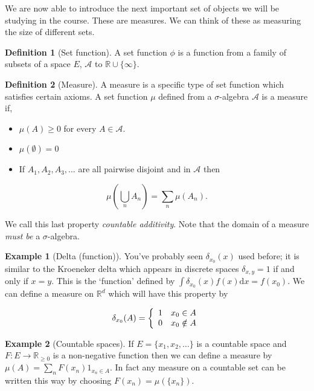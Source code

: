 \documentclass[
]{book}
\providecommand{\tightlist}{%
  \setlength{\itemsep}{0pt}\setlength{\parskip}{0pt}}
\theoremstyle{definition}
\newtheorem{definition}{Definition}[chapter]
\theoremstyle{definition}
\newtheorem{example}{Example}[chapter]
\theoremstyle{definition}
\theoremstyle{definition}
\theoremstyle{remark}
\begin{document}
We are now able to introduce the next important set of objects we will be studying in the course. These are measures. We can think of these as measuring the size of different sets.

\begin{definition}[Set function]
A set function \(\phi\) is a function from a family of subsets of a space \(E\), \(\mathcal{A}\) to \(\mathbb{R}\cup\{\infty\}\).
\end{definition}

\begin{definition}[Measure]
A measure is a specific type of set function which satisfies certain axioms. A set function \(\mu\) defined from a \(\sigma\)-algebra \(\mathcal{A}\) is a measure if,

\begin{itemize}
\tightlist
\item
  \(\mu(A) \geq 0\) for every \(A \in \mathcal{A}\).
\item
  \(\mu(\emptyset) = 0\)
\item
  If \(A_1, A_2, A_3, \dots\) are all pairwise disjoint and in \(\mathcal{A}\) then
\end{itemize}

\[\mu \left( \bigcup_n A_n \right) = \sum_n \mu(A_n).\]

We call this last property \emph{countable additivity}. Note that the domain of a measure \emph{must be} a \(\sigma\)-algebra.
\end{definition}

\begin{example}[Delta (function)]
You've probably seen \(\delta_{x_0}(x)\) used before; it is similar to the Kroeneker delta which appears in discrete spaces \(\delta_{x,y} = 1\) if and only if \(x=y\). This is the `function' defined by \(\int \delta_{x_0}(x)f(x) \mathrm{d}x = f(x_0)\). We can define a measure on \(\mathbb{R}^d\) which will have this property by

\[\delta_{x_0}(A) = \left\{ \begin{array}{l l} 1 & x_0 \in A \\ 0 & x_0 \notin A \end{array} \right.\]
\end{example}

\begin{example}[Countable spaces]
If \(E = \{ x_1, x_2, \dots\}\) is a countable space and \(F: E \rightarrow \mathbb{R}_{\geq 0}\) is a non-negative function then we can define a measure by \(\mu(A) = \sum_n F(x_n)1_{x_n \in A}\). In fact any measure on a countable set can be written this way by choosing \(F(x_n) = \mu(\{x_n\})\).
\end{example}
\end{document}
